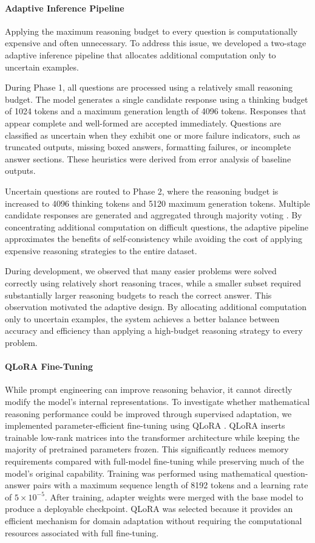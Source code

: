 \documentclass{article}
\begin{document}
\paragraph{Adaptive Inference Pipeline} Applying the maximum reasoning budget to every question is computationally expensive and often unnecessary. To address this issue, we developed a two-stage adaptive inference pipeline that allocates additional computation only to uncertain examples.

During Phase 1, all questions are processed using a relatively small reasoning budget. The model generates a single candidate response using a thinking budget of 1024 tokens and a maximum generation length of 4096 tokens. Responses that appear complete and well-formed are accepted immediately. Questions are classified as uncertain when they exhibit one or more failure indicators, such as truncated outputs, missing boxed answers, formatting failures, or incomplete answer sections. These heuristics were derived from error analysis of baseline outputs.

Uncertain questions are routed to Phase 2, where the reasoning budget is increased to 4096 thinking tokens and 5120 maximum generation tokens. Multiple candidate responses are generated and aggregated through majority voting \cite{wang2022selfconsistency}. By concentrating additional computation on difficult questions, the adaptive pipeline approximates the benefits of self-consistency \cite{snell2024scaling} while avoiding the cost of applying expensive reasoning strategies to the entire dataset.

During development, we observed that many easier problems were solved correctly using relatively short reasoning traces, while a smaller subset required substantially larger reasoning budgets to reach the correct answer. This observation motivated the adaptive design. By allocating additional computation only to uncertain examples, the system achieves a better balance between accuracy and efficiency than applying a high-budget reasoning strategy to every problem.

\paragraph{QLoRA Fine-Tuning} While prompt engineering can improve reasoning behavior, it cannot directly modify the model's internal representations. To investigate whether mathematical reasoning performance could be improved through supervised adaptation, we implemented parameter-efficient fine-tuning using QLoRA \cite{dettmers2023qlora}. QLoRA inserts trainable low-rank matrices \cite{hu2021lora} into the transformer architecture while keeping the majority of pretrained parameters frozen. This significantly reduces memory requirements compared with full-model fine-tuning while preserving much of the model's original capability. Training was performed using mathematical question-answer pairs with a maximum sequence length of 8192 tokens and a learning rate of $5 \times 10 ^{-5}$. After training, adapter weights were merged with the base model to produce a deployable checkpoint. QLoRA was selected because it provides an efficient mechanism for domain adaptation without requiring the computational resources associated with full fine-tuning.
\end{document}
